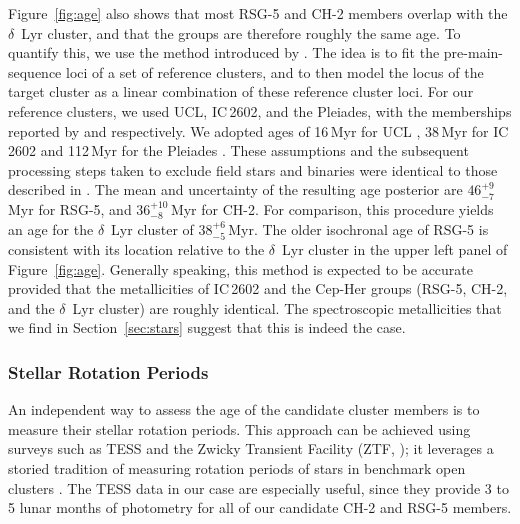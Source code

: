 \documentclass[12pt,twocolumn,tighten,linenumbers]{aastex63}
\begin{document}
Figure~\ref{fig:age} also shows that most RSG-5 and CH-2 members
overlap with the $\delta$~Lyr cluster, and that the groups are
therefore roughly the same age.  To quantify this, we use the method
introduced by \citet[][their Section~6.3]{gagne_mutau_2020}.  The idea
is to fit the pre-main-sequence loci of a set of reference clusters,
and to then model the locus of the target cluster as a linear
combination of these reference cluster loci.  For our reference
clusters, we used UCL, IC\,2602, and the Pleiades, with the
memberships reported by \citet{Damiani2019} and
\cite{CantatGaudin2018a} respectively.  We adopted ages of 16\,Myr for
UCL \citep{pecaut_star_2016}, 38\,Myr for IC\,2602
\citep{david_ages_2015,randich_gaiaeso_2018} and 112\,Myr for the
Pleiades \citep{dahm_2015}.  These assumptions and the subsequent
processing steps taken to exclude field stars and binaries were
identical to those described in \citet{bouma_kep1627_2022}.  The mean
and uncertainty of the resulting age posterior are $46^{+9}_{-7}$\,Myr
for RSG-5, and $36^{+10}_{-8}$\,Myr for CH-2.  For comparison, this
procedure yields an age for the $\delta$~Lyr cluster of
$38^{+6}_{-5}$\,Myr.  The older isochronal age of RSG-5 is consistent
with its location relative to the $\delta$~Lyr cluster in the upper
left panel of Figure~\ref{fig:age}.
Generally speaking, this method is expected to be accurate provided
that the metallicities of IC\,2602 and the Cep-Her groups (RSG-5,
CH-2, and the $\delta$~Lyr cluster) are roughly identical.  The
spectroscopic metallicities that we find in Section~\ref{sec:stars}
suggest that this is indeed the case.


\subsubsection{Stellar Rotation Periods}
\label{sec:rotation}

An independent way to assess the age of the candidate cluster members
is to measure their stellar rotation periods.  This approach can be
achieved using surveys such as TESS \citep{ricker_transiting_2015} and
the Zwicky Transient Facility (ZTF, \citealt{bellm_zwicky_2019}); it
leverages a storied tradition of measuring rotation periods of stars
in benchmark open clusters \citep[see
{e.g.},][]{skumanich_time_1972,curtis_rup147_2020}.  The TESS data in
our case are especially useful, since they provide 3 to 5 lunar months
of photometry for all of our candidate CH-2 and RSG-5 members.
\end{document}
